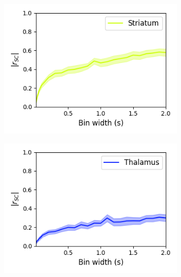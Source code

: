 \documentclass[a4paper,12pt]{article}
\theoremstyle{definition}
\begin{document}
\begin{figure}[p]
\begin{subfigure}{0.5\textwidth}
    \includegraphics[width=\textwidth]{figures/linear_bin_width_correlations_striatum_14.png}
  \end{subfigure}
  \begin{subfigure}{0.5\textwidth}
    \centering
    \includegraphics[width=\textwidth]{figures/linear_bin_width_correlations_thalamus_15.png}
  \end{subfigure}
  \begin{subfigure}{0.5\textwidth}
    \centering

\end{subfigure}
\end{figure}
\end{document}
